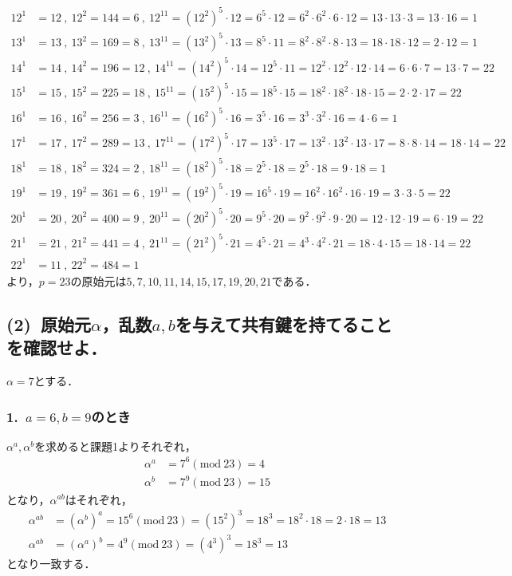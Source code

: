 \documentclass[a4paper,12pt]{jarticle}
\begin{document}
  \begin{align*}
 12^1&=12~,~12^2=144=6~,~12^{11}=(12^2)^5\cdot12=6^5\cdot12=6^2\cdot6^2\cdot6\cdot12=13\cdot13\cdot3=13\cdot16=1\nonumber\\
 13^1&=13~,~13^2=169=8~,~13^{11}=(13^2)^5\cdot13=8^5\cdot11=8^2\cdot8^2\cdot8\cdot13=18\cdot18\cdot12=2\cdot12=1\nonumber\\
 14^1&=14~,~14^2=196=12~,~14^{11}=(14^2)^5\cdot14=12^5\cdot11=12^2\cdot12^2\cdot12\cdot14=6\cdot6\cdot7=13\cdot7=22\nonumber\\
 15^1&=15~,~15^2=225=18~,~15^{11}=(15^2)^5\cdot15=18^5\cdot15=18^2\cdot18^2\cdot18\cdot15=2\cdot2\cdot17=22\nonumber\\
 16^1&=16~,~16^2=256=3~,~16^{11}=(16^2)^5\cdot16=3^5\cdot16=3^3\cdot3^2\cdot16=4\cdot6=1\nonumber\\
 17^1&=17~,~17^2=289=13~,~17^{11}=(17^2)^5\cdot17=13^5\cdot17=13^2\cdot13^2\cdot13\cdot17=8\cdot8\cdot14=18\cdot14=22\nonumber\\
 18^1&=18~,~18^2=324=2~,~18^{11}=(18^2)^5\cdot18=2^5\cdot18=2^5\cdot18=9\cdot18=1\nonumber\\
 19^1&=19~,~19^2=361=6~,~19^{11}=(19^2)^5\cdot19=16^5\cdot19=16^2\cdot16^2\cdot16\cdot19=3\cdot3\cdot5=22\nonumber\\
 20^1&=20~,~20^2=400=9~,~20^{11}=(20^2)^5\cdot20=9^5\cdot20=9^2\cdot9^2\cdot9\cdot20=12\cdot12\cdot19=6\cdot19=22\nonumber\\
 21^1&=21~,~21^2=441=4~,~21^{11}=(21^2)^5\cdot21=4^5\cdot21=4^3\cdot4^2\cdot21=18\cdot4\cdot15=18\cdot14=22\nonumber\\
 22^1&=11~,~22^2=484=1\nonumber
  \end{align*}
%
より，$p=23$の原始元は$5,7,10,11,14,15,17,19,20,21$である．
\vspace{-6mm}
\subsection*{(2)~原始元$\alpha$，乱数$a,b$を与えて共有鍵を持てることを確認せよ．}
\vspace{-3mm}
$\alpha=7$とする．
\vspace{-6mm}
\subsubsection*{1.~$a=6,b=9$のとき}
\vspace{-4mm}
$\alpha^a,\alpha^b$を求めると課題1よりそれぞれ，
%
\begin{align}
 \alpha^a&=7^6(\mathrm{mod}~23)=4 \\
 \alpha^b&=7^9(\mathrm{mod}~23)=15
\end{align}
%
となり，$\alpha^{ab}$はそれぞれ，
%
\begin{align}
 \alpha^{ab}&=(\alpha^b)^a=15^6(\mathrm{mod}~23)=(15^2)^3=18^3=18^2\cdot18=2\cdot18=13\\
 \alpha^{ab}&=(\alpha^a)^b=4^9(\mathrm{mod}~23)=(4^3)^3=18^3=13
\end{align}
%
となり一致する．
\vspace{-6mm}
\end{document}
